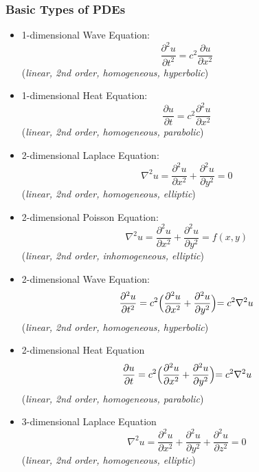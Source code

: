 \subsubsection{Basic Types of PDEs}
\begin{itemize}
    \item 1-dimensional Wave Equation:
    \begin{equation}
        \frac{\partial ^2 u}{\partial t^2} = c^2\frac{\partial u}{\partial x^2}
    \end{equation}
    (\textit{linear, 2nd order, homogeneous, hyperbolic})
    \item 1-dimensional Heat Equation:
    \begin{equation}
        \frac{\partial u}{\partial t} = c^2 \frac{\partial ^2 u}{\partial x^2}
    \end{equation}
    (\textit{linear, 2nd order, homogeneous, parabolic})
    \item 2-dimensional Laplace Equation:
    \begin{equation}
        \nabla^2 u=\frac{\partial^2 u}{\partial x^2}+\frac{\partial ^2 u}{\partial y^2}=0
    \end{equation}
    (\textit{linear, 2nd order, homogeneous, elliptic})
    \item 2-dimensional Poisson Equation:
    \begin{equation}
        \nabla^2 u=\frac{\partial^2 u}{\partial x^2}+\frac{\partial^2 u}{\partial y^2}=f(x,y)
    \end{equation}
    (\textit{linear, 2nd order, inhomogeneous, elliptic})
    \item 2-dimensional Wave Equation:
    \begin{equation}
        \frac{\partial^2u}{\partial t^2}=c^2 \Bigr(\frac{\partial^2 u}{\partial x^2}+\frac{\partial ^2 u}{\partial y^2}\Bigl)=c^2\nabla^2 u
    \end{equation}
    (\textit{linear, 2nd order, homogeneous, hyperbolic})
    \item 2-dimensional Heat Equation
    \begin{equation}
        \frac{\partial u}{\partial t}=c^2\Bigr(\frac{\partial^2 u}{\partial x^2}+\frac{\partial ^2 u}{\partial y^2}\Bigl)=c^2\nabla^2 u
    \end{equation}
    (\textit{linear, 2nd order, homogeneous, parabolic})
    \item 3-dimensional Laplace Equation
    \begin{equation}
        \nabla^2 u=\frac{\partial^2 u}{\partial x^2}+\frac{\partial ^2 u}{\partial y^2}+\frac{\partial ^2 u}{\partial z^2}=0
    \end{equation}
    (\textit{linear, 2nd order, homogeneous, elliptic})
\end{itemize}
%
%
